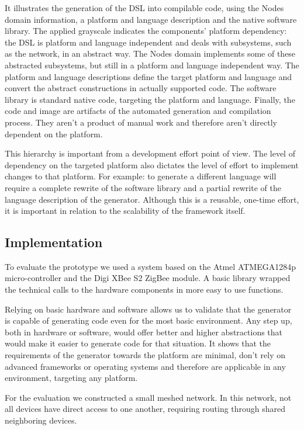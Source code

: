 \documentclass[conference]{IEEEtran}
\begin{document}
It illustrates the generation of the DSL into compilable code, using the Nodes
domain information, a platform and language description and the native software
library. The applied grayscale indicates the components' platform dependency:
the DSL is platform and language independent and deals with subsystems, such as
the network, in an abstract way. The Nodes domain implements some of these
abstracted subsystems, but still in a platform and language independent way.
The platform and language descriptions define the target platform and language
and convert the abstract constructions in actually supported code. The software
library is standard native code, targeting the platform and language. Finally,
the code and image are artifacts of the automated generation and compilation
process. They aren't a product of manual work and therefore aren't directly
dependent on the platform.

This hierarchy is important from a development effort point of view. The level
of dependency on the targeted platform also dictates the level of effort to
implement changes to that platform. For example: to generate a different
language will require a complete rewrite of the software library and a partial
rewrite of the language description of the generator. Although this is a
reusable, one-time effort, it is important in relation to the scalability of
the framework itself.

\subsection{Implementation}

To evaluate the prototype we used a system based on the Atmel ATMEGA1284p
micro-controller and the Digi XBee S2 ZigBee module. A basic library wrapped
the technical calls to the hardware components in more easy to use functions.

Relying on basic hardware and software allows us to validate that the generator
is capable of generating code even for the most basic environment. Any step up,
both in hardware or software, would offer better and higher abstractions that
would make it easier to generate code for that situation. It shows that the
requirements of the generator towards the platform are minimal, don't rely on
advanced frameworks or operating systems and therefore are applicable in any
environment, targeting any platform.

For the evaluation we constructed a small meshed network. In this network, not
all devices have direct access to one another, requiring routing through shared
neighboring devices.
\end{document}
